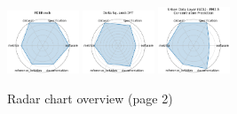 \begin{figure}[ht!]
\includegraphics[width=0.1900\textwidth]{images/pdebench_radar.pdf}
\includegraphics[width=0.1900\textwidth]{images/delta_squared-dft_radar.pdf}
\includegraphics[width=0.1900\textwidth]{images/urban_data_layer_udl_-_pm_concentration_prediction_radar.pdf}
\\[1ex]
\caption{Radar chart overview (page 2)}
\end{figure}


\clearpage

